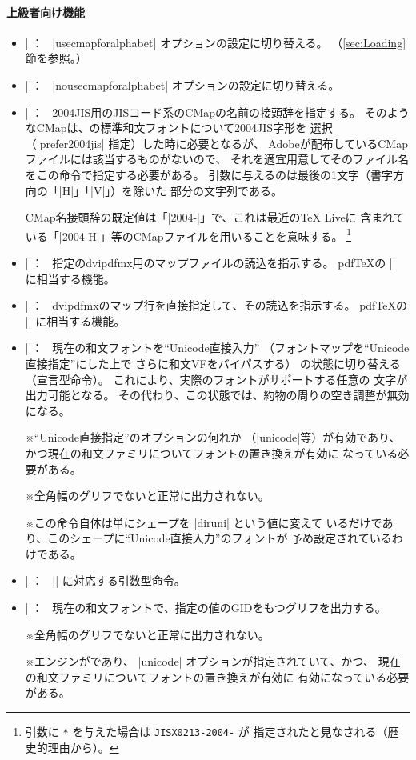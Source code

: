 \documentclass[uplatex,dvipdfmx,a4paper]{jsarticle}
\newcommand{\Meta}[1]{$\langle$\mbox{}#1\mbox{}$\rangle$}
\newcommand{\Note}{\par\noindent ※}
\newcommand{\Means}{：\ }
\begin{document}
\paragraph{上級者向け機能}
\begin{itemize}
\item |\usecmapforalphabet|\Means
  |usecmapforalphabet| オプションの設定に切り替える。
  （\ref{sec:Loading}節を参照。）
\item |\nousecmapforalphabet|\Means
  |nousecmapforalphabet| オプションの設定に切り替える。
\item |\setnewglyphcmapprefix{|\Meta{文字列}|}|\Means
  2004JIS用のJISコード系のCMapの名前の接頭辞を指定する。
  そのようなCMapは、{\pTeX}の標準和文フォントについて2004JIS字形を
  選択（|prefer2004jis| 指定）した時に必要となるが、
  Adobeが配布しているCMapファイルには該当するものがないので、
  それを適宜用意してそのファイル名をこの命令で指定する必要がある。
  引数に与えるのは最後の1文字（書字方向の「|H|」「|V|」）を除いた
  部分の文字列である。\par
  CMap名接頭辞の既定値は「|2004-|」で、これは最近の{\TeX} Liveに
  含まれている「|2004-H|」等のCMapファイルを用いることを意味する。%
  \footnote{%
    引数に \texttt{*} を与えた場合は \texttt{JISX0213-2004-} が
    指定されたと見なされる（歴史的理由から）。}
\item |\usefontmapfile{|\Meta{マップファイル名}|}|\Means
  指定のdvipdfmx用のマップファイルの読込を指示する。
  pdf{\TeX}の |\pdfmapfile| に相当する機能。
\item |\usefontmapline{|\Meta{マップ行}|}|\Means
  dvipdfmxのマップ行を直接指定して、その読込を指示する。
  pdf{\TeX}の |\pdfmapline| に相当する機能。
\item |\diruni|\Means
  現在の和文フォントを“Unicode直接入力”
  （フォントマップを“Unicode直接指定”にした上で
  さらに和文VFをバイパスする）
  の状態に切り替える（宣言型命令）。
  これにより、実際のフォントがサポートする任意の
  文字が出力可能となる。
  その代わり、この状態では、約物の周りの空き調整が無効になる。
  \Note “Unicode直接指定”のオプションの何れか
  （|unicode|等）が有効であり、
  かつ現在の和文ファミリについてフォントの置き換えが有効に
  なっている必要がある。
  \Note 全角幅のグリフでないと正常に出力されない。
  \Note この命令自体は単にシェープを |diruni| という値に変えて
  いるだけであり、このシェープに“Unicode直接入力”のフォントが
  予め設定されているわけである。
\item |\textdiruni{|\Meta{テキスト}|}|\Means
  |\diruni| に対応する引数型命令。
\item |\gid{|\Meta{整数}|}|\Means
  現在の和文フォントで、指定の値のGIDをもつグリフを出力する。
  \Note 全角幅のグリフでないと正常に出力されない。
  \Note エンジンが{\upLaTeX}であり、
  |unicode| オプションが指定されていて、かつ、
  現在の和文ファミリについてフォントの置き換えが有効に
  有効になっている必要がある。
\end{itemize}
\end{document}
